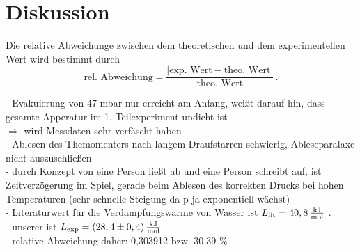 \section{Diskussion}
\label{sec:Diskussion}
Die relative Abweichunge zwischen dem theoretischen und dem experimentellen Wert wird bestimmt durch
$$\text{rel. Abweichung} = \frac{|\text{exp. Wert} - \text{theo. Wert}|}{\text{theo. Wert}}\,.$$

- Evakuierung von 47 mbar nur erreicht am Anfang, weißt darauf hin, dass gesamte Apperatur im 1. Teilexperiment undicht ist \\
$\Rightarrow$ wird Messdaten sehr verfäscht haben \\

- Ablesen des Themomenters nach langem Draufstarren schwierig, Ableseparalaxe nicht auszuschließen \\

- durch Konzept von eine Person ließt ab und eine Person schreibt auf, ist Zeitverzögerung im Spiel, gerade beim Ablesen des korrekten Drucks bei hohen Temperaturen 
(sehr schnelle Steigung da p ja exponentiell wächst)\\

- Literaturwert für die Verdampfungswärme von Wasser ist $L_{\text{lit}} = 40,8 \, \unit[per-mode=fraction]{\kilo\joule\per\mol}$ \cite{L_Literatur}.\\

- unserer ist $L_{\text{exp}} = (28,4 \pm 0,4) \, \unit[per-mode=fraction]{\kilo\joule\per\mol}$ \\

- relative Abweichung daher: 0,303912 bzw. 30,39 \%




